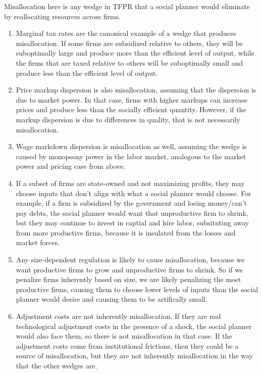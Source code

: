 \documentclass{article}
\begin{document}
    Misallocation here is any wedge in TFPR that a social planner would eliminate by reallocating resources across firms.

\begin{enumerate}[label=(\alph*)]
    
     \item Marginal tax rates are the canonical example of a wedge that produces misallocation. 
     If some firms are subsidized relative to others, they will be suboptimally large and produce more than the efficient level of output, while the firms that are taxed relative to others will be suboptimally small and produce less than the efficient level of output.

    \item Price markup dispersion is also misallocation, assuming that the dispersion is due to market power. 
    In that case, firms with higher markups can increase prices and produce less than the socially efficient quantity. 
    However, if the markup dispersion is due to differences in quality, that is not necessarily misallocation. 

    \item Wage markdown dispersion is misallocation as well, assuming the wedge is caused by monopsony power in the labor market, 
    analogous to the market power and pricing case from above. 

    \item If a subset of firms are state-owned and not maximizing profits, they may choose inputs that don't align with what a social planner would choose.
    For example, if a firm is subsidized by the government and losing money/can't pay debts, the social planner would want that unproductive firm to shrink, but they
    may continue to invest in captial and hire labor, subsituting away from more productive firms, because it is insulated from the losses and market forces. 

    \item Any size-dependent regulation is likely to cause misallocation, because we want productive firms to grow and unproductive firms to shrink. 
    So if we penalize firms inherently based on size, we are likely penalizing the most productive firms, causing them to choose lower levels of inputs than the social planner would desire and 
    causing them to be artifically small. 

    \item Adjustment costs are not inherently misallocation. 
    If they are real technological adjustment costs in the presence of a shock, the social planner would also face them, 
    so there is not misallocation in that case. If the adjustment costs come from institutional frictions, then they could be a source of misallocation, 
    but they are not inherently misallocation in the way that the other wedges are.


\end{enumerate}
\end{document}
